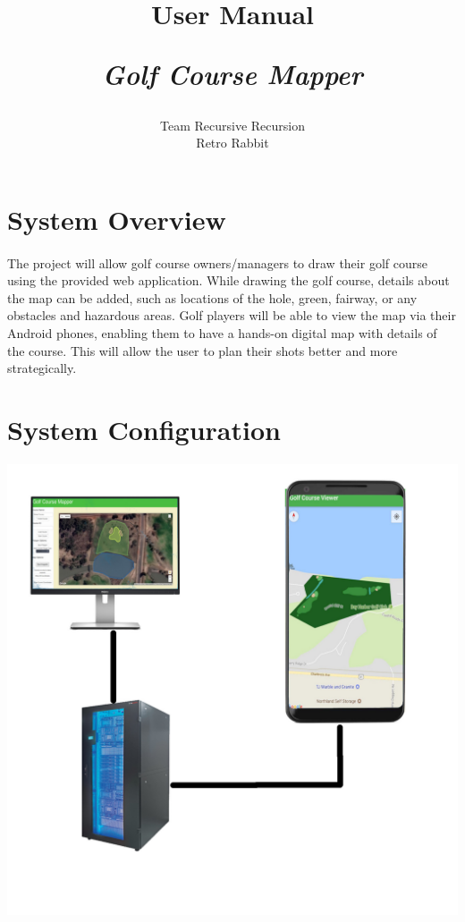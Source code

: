 \documentclass{article}
\title{
    User Manual\\
    \begin{large}
        \textit{Golf Course Mapper}
    \end{large}
}
\date{
    \begin{small}
        \today
    \end{small}
}
\author{
    Team Recursive Recursion \\
    Retro Rabbit
}
\begin{document}
    \maketitle
    \newpage


    
    \tableofcontents
    \newpage
	\section{System Overview}    
	\paragraph{}
	The project will allow golf course owners/managers to draw their golf course using the provided web application. While drawing the golf course, details about the map can be added, such as locations of the hole, green, fairway, or any obstacles and hazardous areas.
Golf players will be able to view the map via their Android phones, enabling them to have a hands-on digital map with details of the course. This will allow the user to plan their shots better and more strategically.


	\section{System Configuration}
	 \includegraphics[scale=0.25]{sys-conf-diagram.jpg}
\end{document}

